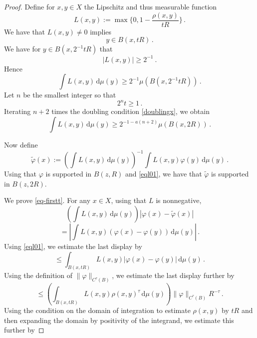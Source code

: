 \begin{proof}
   Define for $x,y\in X$ the Lipschitz and thus measurable function
     \begin{equation}
           L(x,y) := \max\{0, 1 - \frac{\rho(x,y)}{tR}\}\, .
    \end{equation}
We have that $L(x,y)\neq 0$ implies
\begin{equation}\label{eql01}
    y\in B(x, tR)\, .
\end{equation}
We have for $y\in B(x, 2^{-1}tR)$ that
\begin{equation}\label{eql30}
           |L(x,y)|\ge 2^{-1} \ .
    \end{equation}
Hence
\begin{equation}
    \int L(x,y) \, \mathrm{d}\mu(y)\ge 2^{-1}\mu(B(x, 2^{-1}tR))\, .
\end{equation}
 Let $n$ be the smallest integer so that
 \begin{equation}\label{2nt1}
     2^nt\ge 1\, .
 \end{equation}
 Iterating $n+2$ times the doubling condition \eqref{doublingx}, we obtain
 \begin{equation}\label{eql32}
    \int L(x,y) \, \mathrm{d}\mu(y)\ge 2^{-1-a(n+2)}\mu(B(x, 2R))\, .
 \end{equation}

Now define
    $$
        \tilde \varphi(x) := \left(\int L(x,y) \, \mathrm{d}\mu(y)\right)^{-1}\int L(x,y) \varphi(y) \, \mathrm{d}\mu(y)\, .
    $$
Using that $\varphi$ is supported in $B(z,R)$ and
\eqref{eql01}, we have that $\tilde{\varphi}$ is supported in $B(z,2R)$.

We prove \eqref{eq-firstt}.
 For any $x\in X$, using that $L$ is nonnegative,
   \begin{equation}\label{eql1}
    \left(\int L(x,y) \, \mathrm{d}\mu(y)\right)
        |\varphi(x) - \tilde \varphi(x)|
    \end{equation}
 \begin{equation}\label{eql2}
 = \left| \int L(x,y)(\varphi(x) - \varphi(y)) \, \mathrm{d}\mu(y)\right|\, .
    \end{equation}
Using \eqref{eql01}, we estimate the last display by
 \begin{equation}\label{eql3}
         \le \int_{B(x, tR)} L(x,y)|\varphi(x) - \varphi(y)| \, \mathrm{d}\mu(y)\, .\end{equation}
  Using the definition of $\|\varphi\|_{C^\tau(B)}$, we estimate the last display further by
       \begin{equation}\label{eql4}
         \le \left(\int_{B(x, tR)} L(x,y)
          \rho(x,y)^\tau \, \mathrm{d}\mu(y) \right)\|\varphi\|_{C^\tau(B)}R^{-\tau}\, .
    \end{equation}
  Using the condition on the domain of integration to estimate $\rho(x,y)$ by $tR$ and then expanding the domain by positivity of the integrand, we estimate this further by


\end{proof}

